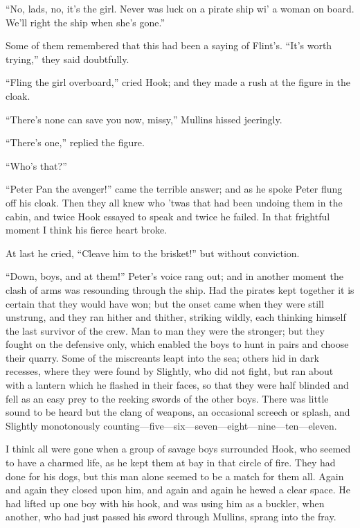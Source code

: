 ``No, lads, no, it's the girl. Never was luck on a pirate ship wi' a
woman on board. We'll right the ship when she's gone.''

Some of them remembered that this had been a saying of Flint's. ``It's
worth trying,'' they said doubtfully.

``Fling the girl overboard,'' cried Hook; and they made a rush at the
figure in the cloak.

``There's none can save you now, missy,'' Mullins hissed jeeringly.

``There's one,'' replied the figure.

``Who's that?''

``Peter Pan the avenger!'' came the terrible answer; and as he spoke
Peter flung off his cloak. Then they all knew who 'twas that had been
undoing them in the cabin, and twice Hook essayed to speak and twice he
failed. In that frightful moment I think his fierce heart broke.

At last he cried, ``Cleave him to the brisket!'' but without conviction.

``Down, boys, and at them!'' Peter's voice rang out; and in another
moment the clash of arms was resounding through the ship. Had the
pirates kept together it is certain that they would have won; but the
onset came when they were still unstrung, and they ran hither and
thither, striking wildly, each thinking himself the last survivor of
the crew. Man to man they were the stronger; but they fought on the
defensive only, which enabled the boys to hunt in pairs and choose
their quarry. Some of the miscreants leapt into the sea; others hid in
dark recesses, where they were found by Slightly, who did not fight,
but ran about with a lantern which he flashed in their faces, so that
they were half blinded and fell as an easy prey to the reeking swords
of the other boys. There was little sound to be heard but the clang of
weapons, an occasional screech or splash, and Slightly monotonously
counting—five—six—seven—eight—nine—ten—eleven.

I think all were gone when a group of savage boys surrounded Hook, who
seemed to have a charmed life, as he kept them at bay in that circle of
fire. They had done for his dogs, but this man alone seemed to be a
match for them all. Again and again they closed upon him, and again and
again he hewed a clear space. He had lifted up one boy with his hook,
and was using him as a buckler, when another, who had just passed his
sword through Mullins, sprang into the fray.

